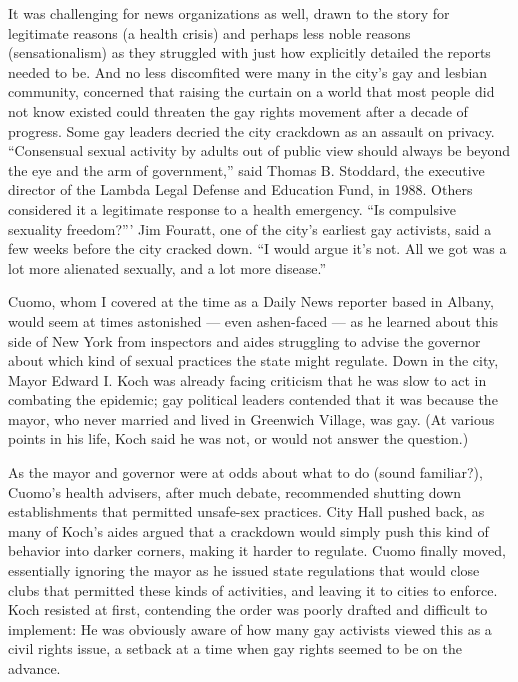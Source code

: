 It was challenging for news organizations as well, drawn to the story
for legitimate reasons (a health crisis) and perhaps less noble reasons
(sensationalism) as they struggled with just how explicitly detailed the
reports needed to be. And no less discomfited were many in the city's
gay and lesbian community, concerned that raising the curtain on a world
that most people did not know existed could threaten the gay rights
movement after a decade of progress. Some gay leaders decried the city
crackdown as an assault on privacy. ``Consensual sexual activity by
adults out of public view should always be beyond the eye and the arm of
government,'' said Thomas B. Stoddard, the executive director of the
Lambda Legal Defense and Education Fund, in 1988. Others considered it a
legitimate response to a health emergency. ``Is compulsive sexuality
freedom?''' Jim Fouratt, one of the city's earliest gay activists, said
a few weeks before the city cracked down. ``I would argue it's not. All
we got was a lot more alienated sexually, and a lot more disease.''

Cuomo, whom I covered at the time as a Daily News reporter based in
Albany, would seem at times astonished --- even ashen-faced --- as he
learned about this side of New York from inspectors and aides struggling
to advise the governor about which kind of sexual practices the state
might regulate. Down in the city, Mayor Edward I. Koch was already
facing criticism that he was slow to act in combating the epidemic; gay
political leaders contended that it was because the mayor, who never
married and lived in Greenwich Village, was gay. (At various points in
his life, Koch said he was not, or would not answer the question.)

As the mayor and governor were at odds about what to do (sound
familiar?), Cuomo's health advisers, after much debate, recommended
shutting down establishments that permitted unsafe-sex practices. City
Hall pushed back, as many of Koch's aides argued that a crackdown would
simply push this kind of behavior into darker corners, making it harder
to regulate. Cuomo finally moved, essentially ignoring the mayor as he
issued state regulations that would close clubs that permitted these
kinds of activities, and leaving it to cities to enforce. Koch resisted
at first, contending the order was poorly drafted and difficult to
implement: He was obviously aware of how many gay activists viewed this
as a civil rights issue, a setback at a time when gay rights seemed to
be on the advance.

